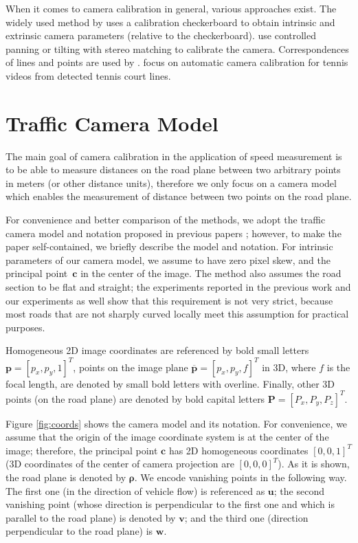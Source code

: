 \documentclass[]{elsarticle}
\begin{document}
When it comes to camera calibration in general, various approaches exist. The widely used method by  \cite{Zhang2000} uses a calibration checkerboard to obtain intrinsic and extrinsic camera parameters (relative to the checkerboard). \cite{Liu2012} use controlled panning or tilting with stereo matching to calibrate the camera. Correspondences of lines and points are used by \cite{Chaperon2011}. \cite{Yu2009} focus on automatic camera calibration for tennis videos from detected tennis court lines. 




\section{Traffic Camera Model} \label{sec:CameraModel}


The main goal of camera calibration in the application of speed measurement is to be able to measure distances on the road plane between two arbitrary points in meters (or other distance units), therefore we only focus on a camera model which enables the measurement of distance between two points on the road plane.

For convenience and better comparison of the methods, we adopt the traffic camera model and notation proposed in previous papers \citep{Dubska2014,Dubska2015ITS}; however, to make the paper self-contained, we briefly describe the model and notation. For intrinsic parameters of our camera model, we assume to have zero pixel skew, and the principal point~$\mathbf{c}$ in the center of the image.
The method also assumes the road section to be flat and straight; the experiments reported in the previous work and our experiments as well show that this requirement is not very strict, because most roads that are not sharply curved locally meet this assumption for practical purposes.

Homogeneous 2D image coordinates are referenced by bold small letters $\mathbf{p} = [p_x, p_y, 1]^T$, points on the image plane $\mathbf{\overline{p}} = [p_x, p_y, f]^T$ in 3D, where $f$ is the focal length, are denoted by small bold letters with overline. Finally, other 3D points (on the road plane) are denoted by bold capital letters $\mathbf{P} = [P_x, P_y, P_z]^T$. 


Figure \ref{fig:coords} shows the camera model and its notation. For convenience, we assume that the origin of the image coordinate system is at the center of the image; therefore, the principal point $\mathbf{c}$ has 2D homogeneous coordinates $[0,0,1]^T$ (3D coordinates of the center of camera projection are $[0,0,0]^T$). As it is shown, the road plane is denoted by $\boldsymbol{\rho}$. We encode vanishing points in the following way.  The first one (in the direction of vehicle flow) is referenced as $\mathbf{u}$;
the second vanishing point (whose direction is perpendicular to the first one and which is parallel to the road plane) is denoted by $\mathbf{v}$; and the third one (direction perpendicular to the road plane) is $\mathbf{w}$.
\end{document}

